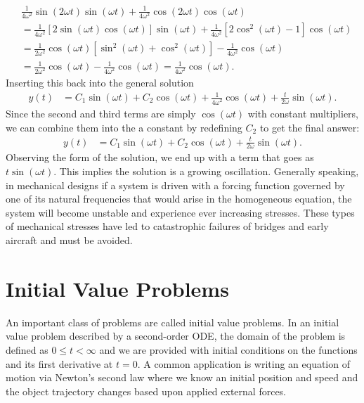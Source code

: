 \begin{align}
  &\frac{1}{4\omega^2} \sin(2\omega t) \sin(\omega t) + \frac{1}{4\omega^2} \cos(2\omega t) \cos(\omega t) \nonumber \\
  &= \frac{1}{4\omega^2} [ 2 \sin( \omega t ) \cos( \omega t ) ] \sin(\omega t) + \frac{1}{4\omega^2} [ 2 \cos^2 ( \omega t ) - 1 ] \cos(\omega t) \nonumber \\
  &= \frac{1}{2\omega^2} \cos(\omega t) \left[ \sin^2(\omega t) + \cos^2(\omega t ) \right] - \frac{1}{4\omega^2} \cos(\omega t) \nonumber \\
  &= \frac{1}{2\omega^2} \cos(\omega t) - \frac{1}{4\omega^2} \cos(\omega t) = \frac{1}{4\omega^2} \cos(\omega t) . \nonumber
\end{align}
Inserting this back into the general solution
\begin{align} 
  y(t) &= C_1 \sin(\omega t) + C_2 \cos(\omega t) + \frac{1}{4\omega^2} \cos(\omega t) + \frac{t}{2\omega} \sin(\omega t) .
\end{align}
Since the second and third terms are simply $\cos( \omega t)$ with constant multipliers, we can combine them into the a constant by redefining $C_2$ to get the final answer:
\begin{align} 
  y(t) &= C_1 \sin(\omega t) + C_2 \cos(\omega t) + \frac{t}{2\omega} \sin(\omega t) .
\end{align}
Observing the form of the solution, we end up with a term that goes as $t \sin( \omega t)$. This implies the solution is a growing oscillation. Generally speaking, in mechanical designs if a system is driven with a forcing function governed by one of its natural frequencies that would arise in the homogeneous equation, the system will become unstable and experience ever increasing stresses. These types of mechanical stresses have led to catastrophic failures of bridges and early aircraft and must be avoided.

\section{Initial Value Problems}

An important class of problems are called initial value problems. In an initial value problem described by a second-order ODE, the domain of the problem is defined as $0 \le t < \infty$ and we are provided with initial conditions on the functions and its first derivative at $t = 0$. A common application is writing an equation of motion via Newton's second law where we know an initial position and speed and the object trajectory changes based upon applied external forces. 

